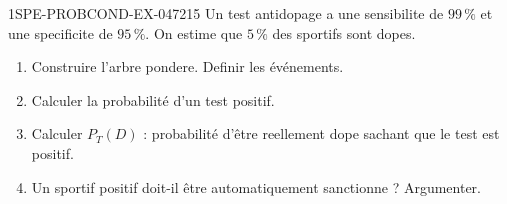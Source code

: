 \begin{exercice}{1SPE-PROBCOND-EX-047}{2}{15}
Un test antidopage a une sensibilite de $99\,\%$ et une specificite de $95\,\%$. On estime que $5\,\%$ des sportifs sont dopes.

\begin{enumerate}
  \item Construire l'arbre pondere. Definir les événements.
  \item Calculer la probabilité d'un test positif.
  \item Calculer $P_T(D)$ : probabilité d'être reellement dope sachant que le test est positif.
  \item Un sportif positif doit-il être automatiquement sanctionne ? Argumenter.
\end{enumerate}
\end{exercice}
